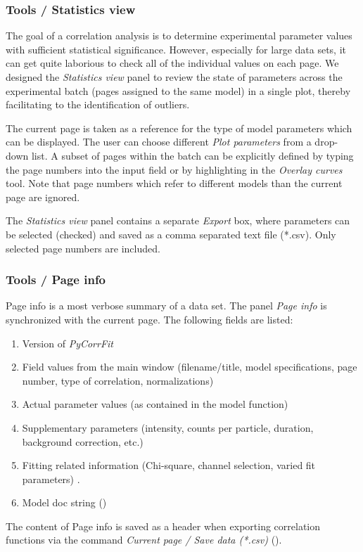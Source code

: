 \subsubsection{Tools / Statistics view}
\label{sec:menub.tools.stati}
The goal of a correlation analysis is to determine experimental parameter values with sufficient statistical significance. However, especially for large data sets, it can get quite laborious to check all of the individual values on each page. We designed the \textit{Statistics view} panel to review the state of parameters across the experimental batch (pages assigned to the same model) in a single plot, thereby facilitating to the identification of outliers.

The current page is taken as a reference for the type of model parameters which can be displayed. The user can choose different \textit{Plot parameters} from a drop-down list. A subset of pages within the batch can be explicitly defined by typing the page numbers into the input field or by highlighting in the \textit{Overlay curves} tool. Note that page numbers which refer to different models than the current page are ignored. 

The \textit{Statistics view} panel contains a separate \textit{Export} box, where parameters can be selected (checked) and saved as a comma separated text file (*.csv). Only selected page numbers are included.

\subsubsection{Tools / Page info}
\label{sec:menub.tools.pagei}
Page info is a most verbose summary of a data set. The panel \textit{Page info} is synchronized with the current page. The following fields are listed:


\begin{enumerate}
\item Version of \textit{PyCorrFit}
\item Field values from the main window (filename/title, model specifications, page number, type of correlation, normalizations)
\item Actual parameter values (as contained in the model function)
\item Supplementary parameters (intensity, counts per particle, duration, background correction, etc.)
\item Fitting related information (Chi-square, channel selection, varied fit parameters) .
\item Model doc string ()
\end{enumerate}
The content of Page info is saved as a header when exporting correlation functions via the command \textit{Current page / Save data (*.csv)} ().

